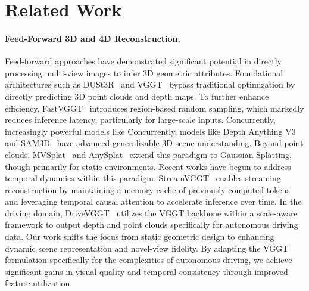 \section{Related Work}
\label{sec:related-work}

\paragraph{Feed-Forward 3D and 4D Reconstruction.}
Feed-forward approaches have demonstrated significant potential in directly processing multi-view images to infer 3D geometric attributes. Foundational architectures such as DUSt3R~\cite{wang2024dust3r} and VGGT~\cite{wang2025vggt} bypass traditional optimization by directly predicting 3D point clouds and depth maps. To further enhance efficiency, FastVGGT~\cite{shen2025fastvggt} introduces region-based random sampling, which markedly reduces inference latency, particularly for large-scale inputs. Concurrently, increasingly powerful models like Concurrently, models like Depth Anything V3~\cite{lin2025depth} and SAM3D~\cite{chen2025sam} have advanced generalizable 3D scene understanding. 
Beyond point clouds, MVSplat~\cite{chen2024mvsplat} and AnySplat~\cite{jiang2025anysplat} extend this paradigm to Gaussian Splatting, though primarily for static environments.
Recent works have begun to address temporal dynamics within this paradigm. StreamVGGT~\cite{zhuo2025streaming} enables streaming reconstruction by maintaining a memory cache of previously computed tokens and leveraging temporal causal attention to accelerate inference over time. In the driving domain, DriveVGGT~\cite{jia2025drivevggt} utilizes the VGGT backbone within a scale-aware framework to output depth and point clouds specifically for autonomous driving data.
Our work shifts the focus from static geometric design to enhancing dynamic scene representation and novel-view fidelity. By adapting the VGGT formulation specifically for the complexities of autonomous driving, we achieve significant gains in visual quality and temporal consistency through improved feature utilization.


